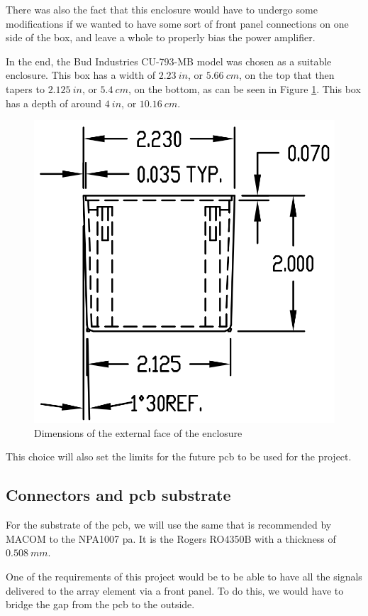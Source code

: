 \par There was also the fact that this enclosure would have to undergo some modifications if we wanted to have some sort of front panel connections on one side of the box, and leave a whole to properly bias the power amplifier.

\par In the end, the Bud Industries CU-793-MB model was chosen as a suitable enclosure. This box has a width of $2.23 \:\si{in}$, or $5.66 \:\si{cm}$, on the top that then tapers to $2.125 \:\si{in}$, or $5.4 \:\si{cm}$, on the bottom, as can be seen in Figure \ref{fig:ch3_CU-793-MB.png}. This box has a depth of around $4 \:\si{in}$, or $10.16 \:\si{cm}$.

\begin{figure}[H]
    \vspace*{0cm}
    \centering
    \includegraphics[width=0.4\linewidth]{figs/ch3_CU-793-MB.png}
    \caption{Dimensions of the external face of the enclosure \cite{UtiliboxCUR-793}}
    \label{fig:ch3_CU-793-MB.png}
\end{figure}

\par This choice will also set the limits for the future \ac{pcb} to be used for the project.

\subsection{Connectors and \ac{pcb} substrate}
\par For the substrate of the \ac{pcb}, we will use the same that is recommended by MACOM to the NPA1007 \acl{pa}. It is the Rogers RO4350B with a thickness of $0.508 \:\si{mm}$.

\par One of the requirements of this project would be to be able to have all the signals delivered to the array element via a front panel. To do this, we would have to bridge the gap from the \ac{pcb} to the outside. 

